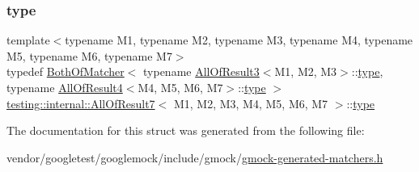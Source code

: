 \subsubsection{\texorpdfstring{type}{type}}
{\footnotesize\ttfamily template$<$typename M1, typename M2, typename M3, typename M4, typename M5, typename M6, typename M7$>$ \\
typedef \hyperlink{classtesting_1_1internal_1_1_both_of_matcher}{Both\+Of\+Matcher}$<$ typename \hyperlink{structtesting_1_1internal_1_1_all_of_result3}{All\+Of\+Result3}$<$M1, M2, M3$>$\+::\hyperlink{structtesting_1_1internal_1_1_all_of_result7_a47ab0d670258434b0e65530591948e8c}{type}, typename \hyperlink{structtesting_1_1internal_1_1_all_of_result4}{All\+Of\+Result4}$<$M4, M5, M6, M7$>$\+::\hyperlink{structtesting_1_1internal_1_1_all_of_result7_a47ab0d670258434b0e65530591948e8c}{type} $>$ \hyperlink{structtesting_1_1internal_1_1_all_of_result7}{testing\+::internal\+::\+All\+Of\+Result7}$<$ M1, M2, M3, M4, M5, M6, M7 $>$\+::\hyperlink{structtesting_1_1internal_1_1_all_of_result7_a47ab0d670258434b0e65530591948e8c}{type}}



The documentation for this struct was generated from the following file\+:\begin{DoxyCompactItemize}
\item 
vendor/googletest/googlemock/include/gmock/\hyperlink{gmock-generated-matchers_8h}{gmock-\/generated-\/matchers.\+h}\end{DoxyCompactItemize}
